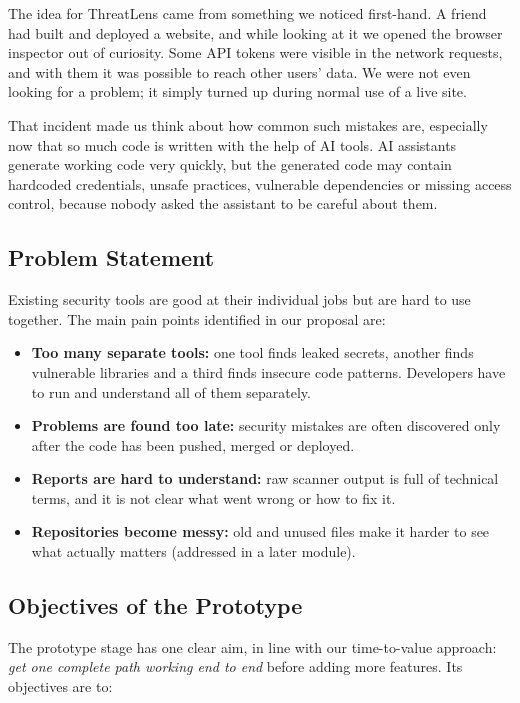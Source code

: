 \documentclass[12pt,a4paper]{article}
\begin{document}
The idea for ThreatLens came from something we noticed first-hand. A friend had built and deployed a website, and while looking at it we opened the browser inspector out of curiosity. Some API tokens were visible in the network requests, and with them it was possible to reach other users' data. We were not even looking for a problem; it simply turned up during normal use of a live site.

That incident made us think about how common such mistakes are, especially now that so much code is written with the help of AI tools. AI assistants generate working code very quickly, but the generated code may contain hardcoded credentials, unsafe practices, vulnerable dependencies or missing access control, because nobody asked the assistant to be careful about them.

\subsection{Problem Statement}

Existing security tools are good at their individual jobs but are hard to use together. The main pain points identified in our proposal are:

\begin{itemize}
    \item \textbf{Too many separate tools:} one tool finds leaked secrets, another finds vulnerable libraries and a third finds insecure code patterns. Developers have to run and understand all of them separately.
    \item \textbf{Problems are found too late:} security mistakes are often discovered only after the code has been pushed, merged or deployed.
    \item \textbf{Reports are hard to understand:} raw scanner output is full of technical terms, and it is not clear what went wrong or how to fix it.
    \item \textbf{Repositories become messy:} old and unused files make it harder to see what actually matters (addressed in a later module).
\end{itemize}

\subsection{Objectives of the Prototype}

The prototype stage has one clear aim, in line with our time-to-value approach: \emph{get one complete path working end to end} before adding more features. Its objectives are to:
\end{document}
